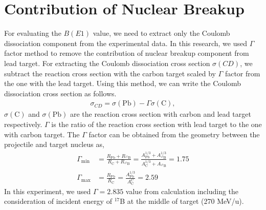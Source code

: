 \section{Contribution of Nuclear Breakup}
For evaluating the $B(E1)$ value, we need to extract only the Coulomb dissociation component from the experimental data. In this research, we used $\Gamma$ factor method to remove the contribution of nuclear breakup component from lead target. For extracting the Coulomb dissociation cross section $\sigma(CD)$, we subtract the reaction cross section with the carbon target scaled by $\Gamma$ factor from the one with the lead target. Using this method, we can write the Coulomb dissociation cross section as follows.
\begin{align}
    \sigma_{CD} = \sigma(\text{Pb}) - \Gamma \sigma(\text{C}),\label{eq:CD}
\end{align}
$\sigma(\text{C})$ and $\sigma(\text{Pb})$ are the reaction cross section with carbon and lead target respectively. $\Gamma$ is the ratio of the reaction cross section with lead target to the one with carbon target. The $\Gamma$ factor can be obtained from the geometry between the projectile and target nucleus as,
\begin{align}
    \Gamma_{\text{min}} &= \frac{R_{\text{Pb}} + R_{{}^{17}\text{B}}}{R_{\text{C}} + R_{{}^{17}\text{B}}} = \frac{A_{\text{Pb}}^{1/3} + A_{^{17}\text{B}}^{1/3}}{A_{\text{C}}^{1/3} + A_{^{17}\text{B}}} = 1.75\\
    \Gamma_{\text{max}} &= \frac{R_{\text{Pb}}}{R_{\text{C}}} = \frac{A_{\text{Pb}}^{1/3}}{A_{\text{C}}^{C}} = 2.59
\end{align}
In this experiment, we used $\Gamma = 2.835$ value from calculation including the consideration of incident energy of $^{17}$B at the middle of target (270 MeV/u)\cite{Ogata}.

